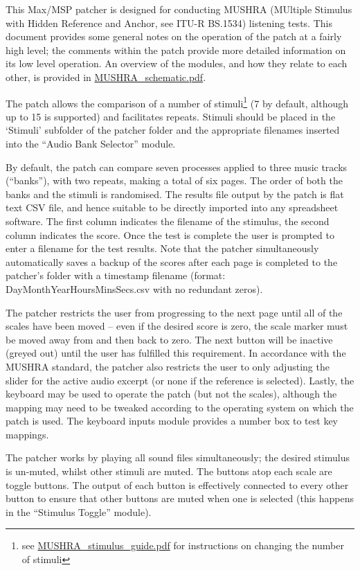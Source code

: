 \documentclass[10pt]{article}
\begin{document}
{\sf\maketitle}

This Max/MSP patcher is designed for conducting MUSHRA (MUltiple Stimulus with Hidden Reference and Anchor, see ITU-R BS.1534) listening tests.  This document provides some general notes on the operation of the patch at a fairly high level; the comments within the patch provide more detailed information on its low level operation. An overview of the modules, and how they relate to each other, is provided in \href{MUSHRA_schematic.pdf}{MUSHRA\_schematic.pdf}.

The patch allows the comparison of a number of stimuli\footnote{see \href{MUSHRA_stimulus_guide.pdf}{MUSHRA\_stimulus\_guide.pdf} for instructions on changing the number of stimuli} (7 by default, although up to 15 is supported) and facilitates repeats.  Stimuli should be placed in the `Stimuli' subfolder of the patcher folder and the appropriate filenames inserted into the ``Audio Bank Selector'' module.

By default, the patch can compare seven processes applied to three music tracks (``banks''), with two repeats, making a total of six pages. The order of both the banks and the stimuli is randomised.  The results file output by the patch is flat text CSV file, and hence suitable to be directly imported into any spreadsheet software. The first column indicates the filename of the stimulus, the second column indicates the score.  Once the test is complete the user is prompted to enter a filename for the test results.  Note that the patcher simultaneously automatically saves a backup of the scores after each page is completed to the patcher's folder with a timestamp filename (format: DayMonthYearHoursMinsSecs.csv with no redundant zeros).

The patcher restricts the user from progressing to the next page until all of the scales have been moved -- even if the desired score is zero, the scale marker must be moved away from and then back to zero.  The next button will be inactive (greyed out) until the user has fulfilled this requirement.  In accordance with the MUSHRA standard, the patcher also restricts the user to only adjusting the slider for the active audio excerpt (or none if the reference is selected). Lastly, the keyboard may be used to operate the patch (but not the scales), although the mapping may need to be tweaked according to the operating system on which the patch is used. The keyboard inputs module provides a number box to test key mappings.

The patcher works by playing all sound files simultaneously; the desired stimulus is un-muted, whilst other stimuli are muted. The buttons atop each scale are toggle buttons. The output of each button is effectively connected to every other button to ensure that other buttons are muted when one is selected (this happens in the ``Stimulus Toggle'' module).
\end{document}
